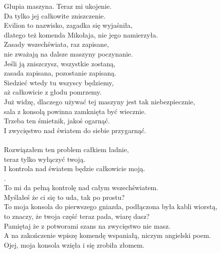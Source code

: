 \charszam{}
Głupia maszyna. Teraz mi ukojenie.\\
Da tylko jej całkowite zniszczenie.\\

\charfer{}
Evilion to nazwisko, zagadka się wyjaśniła,\\
dlatego też komenda Mikołaja, nie jego namierzyła.\\
Zasady wszechświata, raz zapisane,\\
nie zważają na dalsze maszyny poczynanie.\\
Jeśli ją zniszczysz, wszystkie zostaną,\\
zasada zapisana, pozostanie zapisaną.\\
Siedzieć wtedy tu wszyscy będziemy,\\
aż całkowicie z głodu pomrzemy.\\

\charszam{}
Już widzę, dlaczego używać tej maszyny jest tak niebezpiecznie,\\
sala z konsolą powinna zamknięta być wiecznie.\\
Trzeba ten śmietnik, jakoś ogarnąć.\\
I zwycięstwo nad światem do siebie przygarnąć.\\
\\
Rozwiązałem ten problem całkiem ładnie,\\
teraz tylko wyłączyć twoją.\\
I kontrola nad światem będzie całkowicie moją.\\
.\\
To mi da pełną kontrolę nad całym wszechświatem.\\

\charfer{}
Myślałeś że ci się to uda, tak po prostu?\\
To moja konsola do pierwszego gniazda, podłączona była kabli wiorstą,\\
to znaczy, że twoja część teraz pada, wiarę dasz?\\
Pamiętaj że z potworami szans na zwycięstwo nie masz.\\
A na zakończenie wpiszę komendę wspaniałą, niczym angielski poem.\\
Ojej, moja konsola wzięła i się zrobiła złomem.\\

\\

